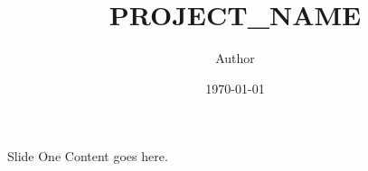 \documentclass{beamer}
\title{{{PROJECT_NAME}}}
\author{Author}
\date{\today}
\begin{document}
\begin{frame}
  \titlepage
\end{frame}

\begin{frame}{Slide One}
  Content goes here.
\end{frame}
\end{document}
